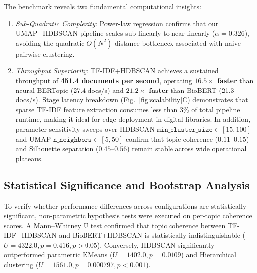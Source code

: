 \documentclass[a4paper,fleqn]{cas-dc}
\begin{document}
The benchmark reveals two fundamental computational insights:
\begin{enumerate}
\item \textit{Sub-Quadratic Complexity}: Power-law regression confirms that our UMAP+HDBSCAN pipeline scales sub-linearly to near-linearly ($\alpha = 0.326$), avoiding the quadratic $O(N^2)$ distance bottleneck associated with naive pairwise clustering.
\item \textit{Throughput Superiority}: TF-IDF+HDBSCAN achieves a sustained throughput of \textbf{451.4 documents per second}, operating \textbf{$16.5\times$ faster} than neural BERTopic (27.4 docs/s) and \textbf{$21.2\times$ faster} than BioBERT (21.3 docs/s). Stage latency breakdown (Fig.~\ref{fig:scalability}C) demonstrates that sparse TF-IDF feature extraction consumes less than 3\% of total pipeline runtime, making it ideal for edge deployment in digital libraries. In addition, parameter sensitivity sweeps over HDBSCAN $\texttt{min\_cluster\_size} \in [15, 100]$ and UMAP $\texttt{n\_neighbors} \in [5, 50]$ confirm that topic coherence ($0.11$--$0.15$) and Silhouette separation ($0.45$--$0.56$) remain stable across wide operational plateaus.
\end{enumerate}

\subsection{Statistical Significance and Bootstrap Analysis}

To verify whether performance differences across configurations are statistically significant, non-parametric hypothesis tests were executed on per-topic coherence scores. A Mann--Whitney U test confirmed that topic coherence between TF-IDF+HDBSCAN and BioBERT+HDBSCAN is statistically indistinguishable ($U = 4322.0, p = 0.416, p > 0.05$). Conversely, HDBSCAN significantly outperformed parametric KMeans ($U = 1402.0, p = 0.0109$) and Hierarchical clustering ($U = 1561.0, p = 0.000797, p < 0.001$). 
\end{document}
